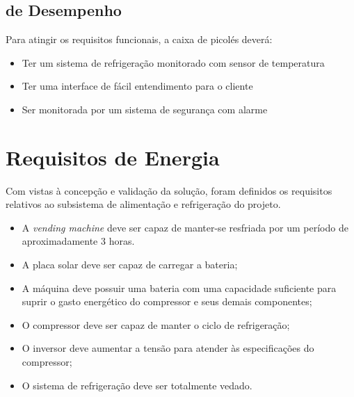 \subsection{de Desempenho}
Para atingir os requisitos funcionais, a caixa de picolés deverá:
\begin{itemize}
\item Ter um sistema de refrigeração monitorado com sensor de temperatura
\item Ter uma interface de fácil entendimento para o cliente
\item Ser monitorada por um sistema de segurança com alarme
\end{itemize}

\section{Requisitos de Energia}

Com vistas à concepção e validação da solução, foram definidos os requisitos relativos ao subsistema de alimentação e refrigeração do projeto.

\begin{itemize}
\item A \textit{vending machine} deve ser capaz de manter-se resfriada por um período de aproximadamente 3 horas.
\item A placa solar deve ser capaz de carregar a bateria;
\item A máquina deve possuir uma bateria com uma capacidade suficiente para suprir o gasto energético do compressor e seus demais componentes;
\item O compressor deve ser capaz de manter o ciclo de refrigeração;
\item O inversor deve aumentar a tensão para atender às especificações do compressor;
\item O sistema de refrigeração deve ser totalmente vedado.
\end{itemize}